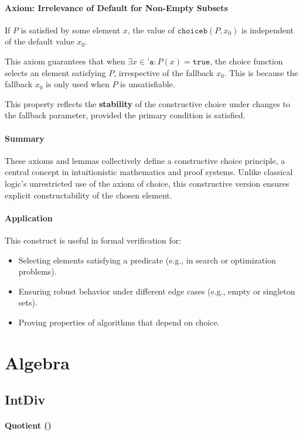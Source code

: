\paragraph{Axiom: Irrelevance of Default for Non-Empty Subsets} If $P$ is satisfied by some element $x$, the value of $\texttt{choiceb}(P,x_0)$ is independent of the default value $x_0$.\par
This axiom guarantees that when $\exists x\in\texttt{'a}:P(x)=\texttt{true}$, the choice function selects an element satisfying $P$, irrespective of the fallback $x_0$. This is because the fallback $x_0$ is only used when $P$ is unsatisfiable.\par
This property reflects the \textbf{stability} of the constructive choice under changes to the fallback parameter, provided the primary condition is satisfied.
\paragraph{Summary} These axioms and lemmas collectively define a constructive choice principle, a central concept in intuitionistic mathematics and proof systems. Unlike classical logic's unrestricted use of the axiom of choice, this constructive version ensures explicit constructability of the chosen element.
\paragraph{Application} This construct is useful in formal verification for:
\begin{itemize}
	\item Selecting elements satisfying a predicate (e.g., in search or optimization problems).
	\item Ensuring robust behavior under different edge cases (e.g., empty or singleton sets).
	\item Proving properties of algorithms that depend on choice.
\end{itemize}

\newpage
\section{Algebra}

\subsection{IntDiv}
\paragraph{Quotient (\easycryptinline{\%/})}
